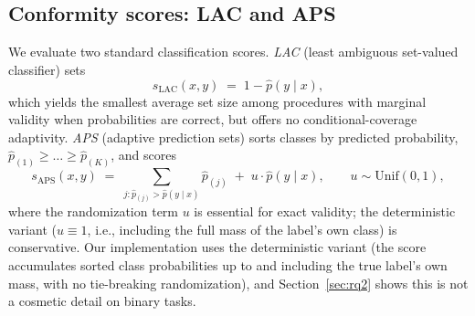 \documentclass[review,12pt]{elsarticle}
\begin{document}
\subsection{Conformity scores: LAC and APS}
We evaluate two standard classification scores.
\emph{LAC} (least ambiguous set-valued classifier) \cite{sadinle2019} sets
\begin{equation}
s_{\mathrm{LAC}}(x,y) \;=\; 1 - \hat p(y \mid x),
\end{equation}
which yields the smallest average set size among procedures with marginal validity when probabilities are correct, but offers no conditional-coverage adaptivity.
\emph{APS} (adaptive prediction sets) \cite{romano2020aps} sorts classes by predicted probability, $\hat p_{(1)} \ge \dots \ge \hat p_{(K)}$, and scores
\begin{equation}
s_{\mathrm{APS}}(x,y) \;=\; \sum_{j : \hat p_{(j)} > \hat p(y\mid x)} \hat p_{(j)} \;+\; u \cdot \hat p(y \mid x),
\qquad u \sim \mathrm{Unif}(0,1),
\end{equation}
where the randomization term $u$ is essential for exact validity; the deterministic variant ($u \equiv 1$, i.e., including the full mass of the label's own class) is conservative. Our implementation uses the deterministic variant (the score accumulates sorted class probabilities up to and including the true label's own mass, with no tie-breaking randomization), and Section~\ref{sec:rq2} shows this is not a cosmetic detail on binary tasks.
\end{document}
